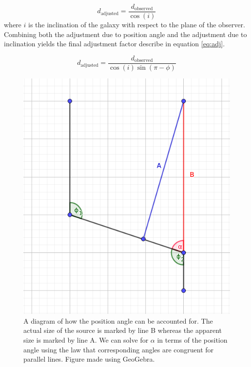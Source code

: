 \documentclass[%
reprint,
amsmath,amssymb,
aps,
]{revtex4-2}
\begin{document}
				\begin{equation}
					d_\text{adjusted} = \frac{d_\text{observed}}{\cos{\left(i\right)}}
					\label{eq:inclination}
				\end{equation}where $i$ is the inclination of the galaxy with respect to the plane of the observer. Combining both the adjustment due to position angle and the adjustment due to inclination yields the final adjustment factor describe in equation \ref{eq:adj}.
			
				\begin{equation}
					d_\text{adjusted} = \frac{d_\text{observed}}{\cos{\left(i\right)}\sin{\left(\pi - \phi\right)}}
					\label{eq:adj}
				\end{equation}
			
				\begin{figure}
					\includegraphics[width=0.75\columnwidth]{positionAngle.png}
					\caption{\label{fig:positionAngle} A diagram of how the position angle can be accounted for. The actual size of the source is marked by line B whereas the apparent size is marked by line A. We can solve for $\alpha$ in terms of the position angle using the law that corresponding angles are congruent for parallel lines. Figure made using GeoGebra.}
				\end{figure}
			
\end{document}

